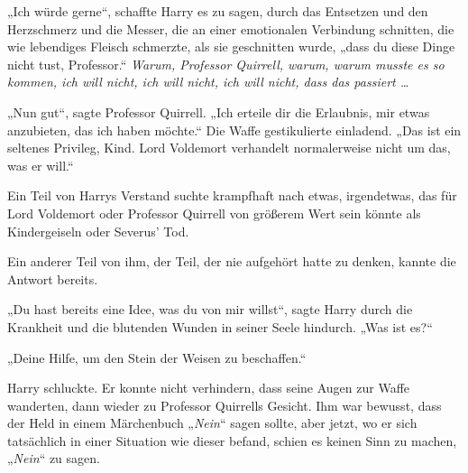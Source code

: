 „Ich würde gerne“, schaffte Harry es zu sagen, durch das Entsetzen und den Herzschmerz und die Messer, die an einer emotionalen Verbindung schnitten, die wie lebendiges Fleisch schmerzte, als sie geschnitten wurde, „dass du diese Dinge nicht tust, Professor.“
\emph{Warum, Professor Quirrell, warum, warum musste es so kommen, ich will nicht, ich will nicht, ich will nicht, dass das passiert …}

„Nun gut“, sagte Professor Quirrell.
„Ich erteile dir die Erlaubnis, mir etwas anzubieten, das ich haben möchte.“
Die Waffe gestikulierte einladend.
„Das ist ein seltenes Privileg, Kind. Lord Voldemort verhandelt normalerweise nicht um das, was er will.“

Ein Teil von Harrys Verstand suchte krampfhaft nach etwas, irgendetwas, das für Lord Voldemort oder Professor Quirrell von größerem Wert sein könnte als Kindergeiseln oder Severus’ Tod.

Ein anderer Teil von ihm, der Teil, der nie aufgehört hatte zu denken, kannte die Antwort bereits.

„Du hast bereits eine Idee, was du von mir willst“, sagte Harry durch die Krankheit und die blutenden Wunden in seiner Seele hindurch.
„Was ist es?“

„Deine Hilfe, um den Stein der Weisen zu beschaffen.“

Harry schluckte. Er konnte nicht verhindern, dass seine Augen zur Waffe wanderten, dann wieder zu Professor Quirrells Gesicht.
Ihm war bewusst, dass der Held in einem Märchenbuch
„\emph{Nein}“ sagen sollte, aber jetzt, wo er sich tatsächlich in einer Situation wie dieser befand, schien es keinen Sinn zu machen,
„\emph{Nein}“ zu sagen.

